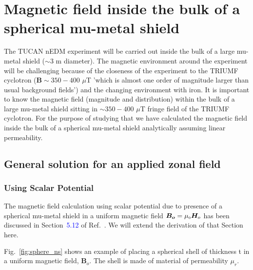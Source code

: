 
\chapter{Magnetic field inside the bulk of a spherical mu-metal shield}

The TUCAN nEDM experiment will be carried out inside the bulk
of a large mu-metal shield ($\sim 3$ m diameter). The magnetic environment around the experiment will be challenging because of the closeness of the experiment to the TRIUMF cyclotron ($\bm{B}\sim 350 - 400$ $\mu$T 'which is almost one order of magnitude larger than usual background fields') and the changing environment with iron. It is important to know the magnetic field (magnitude and distribution) within the bulk of a large mu-metal shield sitting in $\sim 350 - 400$ $\mu$T 
fringe field of the TRIUMF cyclotron. For the purpose of studying that we have calculated the magnetic field inside the bulk of a spherical mu-metal shield analytically assuming linear permeability.


\section{General solution for an applied zonal field}
\subsection{Using Scalar Potential}
The magnetic field calculation using scalar potential due to presence of a spherical mu-metal shield in a uniform magnetic field \(\bm{B_o}= \mu_{\scriptscriptstyle 0} \bm H_o\) has been discussed in Section~\textcolor{blue}{5.12} of Ref.~\cite{jackson}. We will extend the derivation of that Section here.

Fig.~\ref{fig:sphere_ns} shows an example of placing a spherical shell of thickness t in a uniform magnetic field, $\bm B_o$. The shell is made of material of permeability $\mu_r$.

